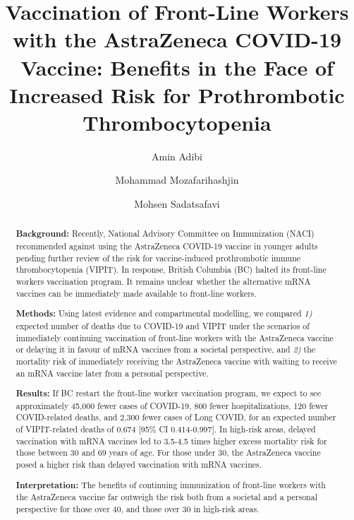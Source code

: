 \documentclass[]{elsarticle} %
\begin{document}
\begin{frontmatter}

  \title{Vaccination of Front-Line Workers with the AstraZeneca COVID-19
Vaccine: Benefits in the Face of Increased Risk for Prothrombotic
Thrombocytopenia}
    \author[UBC]{Amin Adibi}
    \author[Sinai,Microb]{Mohammad Mozafarihashjin}
    \author[UBC]{Mohsen Sadatsafavi}
      \address[UBC]{Respiratory Evaluation Sciences Program,
Collaboration for Outcomes Research and Evaluation (CORE), Faculty of
Pharmaceutical Sciences, University of British Columbia, Vancouver,
British Columbia}
    \address[Sinai]{Lunenfeld-Tanenbaum Research Institute, Sinai Health
System, Toronto, Ontario}
    \address[Microb]{Department of Microbiology, Sinai Health System,
Toronto, Ontario}
  
  \begin{abstract}
  \textbf{Background:} Recently, National Advisory Committee on
  Immunization (NACI) recommended against using the AstraZeneca COVID-19
  vaccine in younger adults pending further review of the risk for
  vaccine-induced prothrombotic immune thrombocytopenia (VIPIT). In
  response, British Columbia (BC) halted its front-line workers
  vaccination program. It remains unclear whether the alternative mRNA
  vaccines can be immediately made available to front-line workers.

  \textbf{Methods:} Using latest evidence and compartmental modelling,
  we compared \emph{1)} expected number of deaths due to COVID-19 and
  VIPIT under the scenarios of immediately continuing vaccination of
  front-line workers with the AstraZeneca vaccine or delaying it in
  favour of mRNA vaccines from a societal perspective, and \emph{2)} the
  mortality risk of immediately receiving the AstraZeneca vaccine with
  waiting to receive an mRNA vaccine later from a personal perspective.

  \textbf{Results:} If BC restart the front-line worker vaccination
  program, we expect to see approximately 45,000 fewer cases of
  COVID-19, 800 fewer hospitalizations, 120 fewer COVID-related deaths,
  and 2,300 fewer cases of Long COVID, for an expected number of
  VIPIT-related deaths of 0.674 {[}95\% CI 0.414-0.997{]}. In high-risk
  areas, delayed vaccination with mRNA vaccines led to 3.5-4.5 times
  higher excess mortality risk for those between 30 and 69 years of age.
  For those under 30, the AstraZeneca vaccine posed a higher risk than
  delayed vaccination with mRNA vaccines.

  \textbf{Interpretation:} The benefits of continuing immunization of
  front-line workers with the AstraZeneca vaccine far outweigh the risk
  both from a societal and a personal perspective for those over 40, and
  those over 30 in high-risk areas.
  \end{abstract}
  
 \end{frontmatter}
\end{document}

